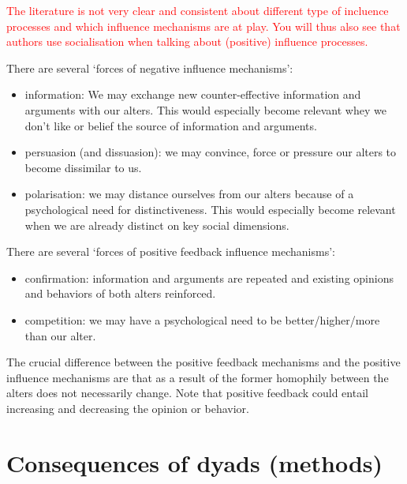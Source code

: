 \documentclass[
]{book}
\providecommand{\tightlist}{%
  \setlength{\itemsep}{0pt}\setlength{\parskip}{0pt}}
\begin{document}
\textcolor{red}{The literature is not very clear and consistent about different type of incluence processes and which influence mechanisms are at play. You will thus also see that authors use socialisation when talking about (positive) influence processes. }

There are several `forces of negative influence mechanisms':

\begin{itemize}
\tightlist
\item
  information: We may exchange new counter-effective information and arguments with our alters. This would especially become relevant whey we don't like or belief the source of information and arguments.\\
\item
  persuasion (and dissuasion): we may convince, force or pressure our alters to become dissimilar to us.
\item
  polarisation: we may distance ourselves from our alters because of a psychological need for distinctiveness. This would especially become relevant when we are already distinct on key social dimensions.
\end{itemize}

There are several `forces of positive feedback influence mechanisms':

\begin{itemize}
\tightlist
\item
  confirmation: information and arguments are repeated and existing opinions and behaviors of both alters reinforced.\\
\item
  competition: we may have a psychological need to be better/higher/more than our alter.
\end{itemize}

The crucial difference between the positive feedback mechanisms and the positive influence mechanisms are that as a result of the former homophily between the alters does not necessarily change. Note that positive feedback could entail increasing and decreasing the opinion or behavior.

\hypertarget{consequences-of-dyads-methods}{%
\section{Consequences of dyads (methods)}\label{consequences-of-dyads-methods}}
\end{document}
